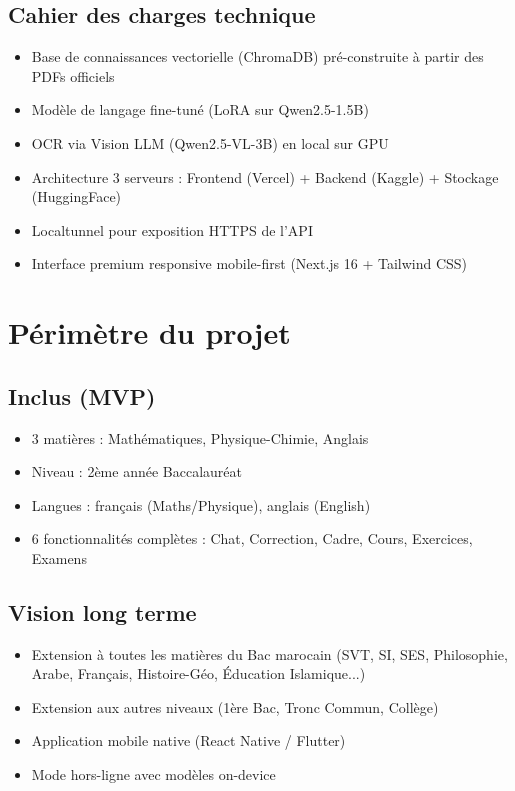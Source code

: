 \documentclass[12pt,a4paper]{report}
\begin{document}
\subsection{Cahier des charges technique}
\begin{itemize}
    \item Base de connaissances vectorielle (ChromaDB) pré-construite à partir des PDFs officiels
    \item Modèle de langage fine-tuné (LoRA sur Qwen2.5-1.5B)
    \item OCR via Vision LLM (Qwen2.5-VL-3B) en local sur GPU
    \item Architecture 3 serveurs : Frontend (Vercel) + Backend (Kaggle) + Stockage (HuggingFace)
    \item Localtunnel pour exposition HTTPS de l'API
    \item Interface premium responsive mobile-first (Next.js 16 + Tailwind CSS)
\end{itemize}

\section{Périmètre du projet}

\subsection{Inclus (MVP)}
\begin{itemize}
    \item 3 matières : Mathématiques, Physique-Chimie, Anglais
    \item Niveau : 2ème année Baccalauréat
    \item Langues : français (Maths/Physique), anglais (English)
    \item 6 fonctionnalités complètes : Chat, Correction, Cadre, Cours, Exercices, Examens
\end{itemize}

\subsection{Vision long terme}
\begin{itemize}
    \item Extension à toutes les matières du Bac marocain (SVT, SI, SES, Philosophie, Arabe, Français, Histoire-Géo, Éducation Islamique...)
    \item Extension aux autres niveaux (1ère Bac, Tronc Commun, Collège)
    \item Application mobile native (React Native / Flutter)
    \item Mode hors-ligne avec modèles on-device
\end{itemize}
\end{document}
